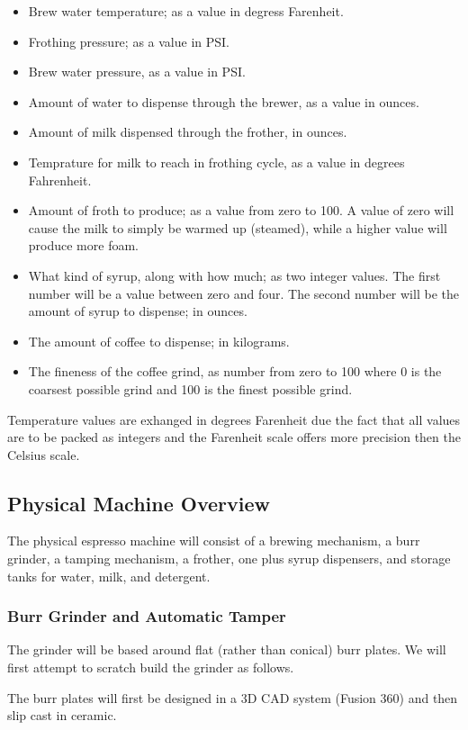 \documentclass[conference]{IEEEtran}
\begin{document}
\begin{itemize}
\item Brew water temperature; as a value in degress Farenheit.
\item Frothing pressure; as a value in PSI.
\item Brew water pressure, as a value in PSI.
\item Amount of water to dispense through the brewer, as a value in ounces.
\item Amount of milk dispensed through the frother, in ounces.
\item Temprature for milk to reach in frothing cycle, as a value in degrees
Fahrenheit.
\item Amount of froth to produce; as a value from zero to 100. A value of zero will cause the milk
  to simply be warmed up (steamed), while a higher value will produce more foam.
\item What kind of syrup, along with how much; as two integer values. The first number will be a
  value between zero and four. The second number will be the amount of syrup to dispense; in ounces.
\item The amount of coffee to dispense; in kilograms.
\item The fineness of the coffee grind, as number from zero to 100 where 0 is the coarsest possible
  grind and 100 is the finest possible grind.
\end{itemize}

Temperature values are exhanged in degrees Farenheit due the fact that all
values are to be packed as integers and the Farenheit scale offers more
precision then the Celsius scale.

\subsection{Physical Machine Overview}

The physical espresso machine will consist of a brewing mechanism, a
burr grinder, a tamping mechanism, a frother, one plus syrup dispensers, and
storage tanks for water, milk, and detergent.

\subsubsection{Burr Grinder and Automatic Tamper}
The grinder will be based around flat (rather than conical) burr plates. We will first
attempt to scratch build the grinder as follows.

The burr plates will first be designed in a 3D CAD system (Fusion 360) and then slip cast
in ceramic.
\end{document}
